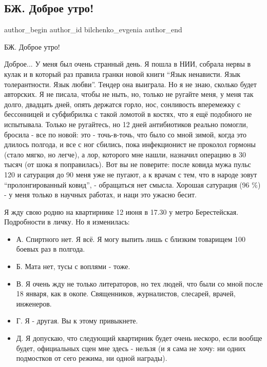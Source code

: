  
 
 
 
 
 
\subsection{БЖ. Доброе утро!}
\label{sec:08_06_2021.fb.bilchenko_evgenia.1.dobroje_utro}
\ifcmt
 author_begin
   author_id bilchenko_evgenia
 author_end
\fi

БЖ. Доброе утро!

Доброе... У меня был очень странный день. Я пошла в НИИ, собрала нервы в кулак
и в который раз правила гранки новой книги \enquote{Язык ненависти. Язык толерантности.
Язык любви}. Тендер она выиграла. Но я не знаю, сколько будет авторских. Я не
писала, чтобы не ныть, но, только не ругайте меня, у меня так долго, двадцать
дней, опять держатся горло, нос, сонливость вперемежку с бессонницей и
субфибрилка с такой ломотой в костях, что я ещё подобного не испытывала. Только
не ругайтесь, но 12 дней антибиотиков реально помогли, бросила - все по новой:
это - точь-в-точь, что было со мной зимой, когда это длилось полгода, и все с
ног сбились, пока инфекционист не проколол гормоны (стало мягко, но легче), а
лор, которого мне нашли, назначил операцию в 30 тысяч (от шока я поправилась).
Вот вы не поверите: после ковида мужа пульс 120 и сатурация до 90 меня уже не
пугают, а к врачам с тем, что в народе зовут \enquote{пролонгированный ковид}, -
обращаться нет смысла. Хорошая сатурация (96 \%) - у меня только в научных
работах, и наци это ужасно бесит.

Я жду свою родню на квартирнике 12 июня в 17.30 у метро Берестейская. Подробности в личку. Но я изменилась: 

\begin{itemize}
\item А. Спиртного нет. Я всё. Я могу выпить лишь с близким товарищем 100 боевых раз в полгода.
\item Б. Мата нет, тусы с воплями - тоже. 
\item В. Я очень жду не только литераторов, но тех людей, что были со мной
после 18 января, как в окопе. Священников, журналистов, слесарей,
врачей, инженеров. 

\item Г. Я - другая. Вы к этому привыкнете. 
\item Д. Я допускаю, что следующий квартирник будет очень нескоро, если вообще будет, официальных сцен мне здесь - нельзя (и я сама не хочу: ни одних подмостков от сего режима, ни одной награды). 
\end{itemize}

